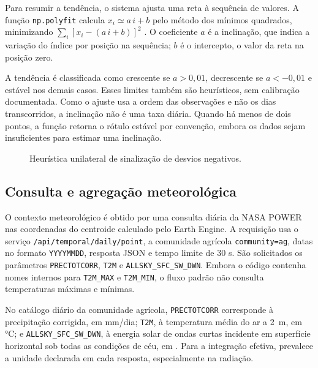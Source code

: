 Para resumir a tendência, o sistema ajusta uma reta à sequência de valores. A função \texttt{np.polyfit} calcula $x_i\simeq a\,i+b$ pelo método dos mínimos quadrados, minimizando $\sum_i[x_i-(a\,i+b)]^2$ \citep{HYNDMAN2021,NUMPY_POLYFIT}. O coeficiente $a$ é a inclinação, que indica a variação do índice por posição na sequência; $b$ é o intercepto, o valor da reta na posição zero.

A tendência é classificada como crescente se $a>0{,}01$, decrescente se $a<-0{,}01$ e estável nos demais casos. Esses limites também são heurísticos, sem calibração documentada. Como o ajuste usa a ordem das observações e não os dias transcorridos, a inclinação não é uma taxa diária. Quando há menos de dois pontos, a função retorna o rótulo estável por convenção, embora os dados sejam insuficientes para estimar uma inclinação.

\begin{figure}[htbp]
\centering
\resizebox{0.92\textwidth}{!}{}
\caption{Heurística unilateral de sinalização de desvios negativos.}
\label{fig:fluxo-anomalias}
\end{figure}

\subsection{Consulta e agregação meteorológica}\label{sec:clima-final}

O contexto meteorológico é obtido por uma consulta diária da NASA POWER nas coordenadas do centroide calculado pelo Earth Engine. A requisição usa o serviço \texttt{/api/temporal/daily/point}, a comunidade agrícola \texttt{community=ag}, datas no formato \texttt{YYYYMMDD}, resposta JSON e tempo limite de 30 s. São solicitados os parâmetros \texttt{PRECTOTCORR}, \texttt{T2M} e \texttt{ALLSKY\_SFC\_SW\_DWN}. Embora o código contenha nomes internos para \texttt{T2M\_MAX} e \texttt{T2M\_MIN}, o fluxo padrão não consulta temperaturas máximas e mínimas.

No catálogo diário da comunidade agrícola, \texttt{PRECTOTCORR} corresponde à precipitação corrigida, em mm/dia; \texttt{T2M}, à temperatura média do ar a 2~m, em °C; e \texttt{ALLSKY\_SFC\_SW\_DWN}, à energia solar de ondas curtas incidente em superfície horizontal sob todas as condições de céu, em \radiacaoTCC{} \citep{NASA_POWER_PARAMETERS}. Para a integração efetiva, prevalece a unidade declarada em cada resposta, especialmente na radiação.

